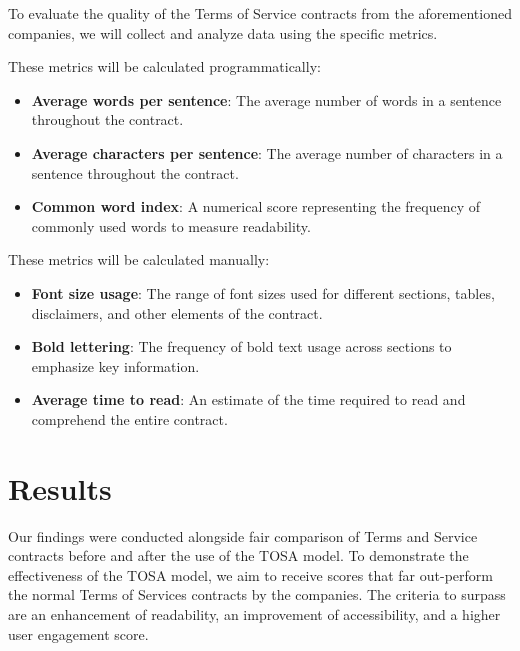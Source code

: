 \documentclass[sigconf, nonacm]{acmart}
\begin{document}
To evaluate the quality of the Terms of Service contracts from the aforementioned companies, we will collect and analyze data using the specific metrics.

These metrics will be calculated programmatically:
\begin{itemize}
\item \textbf{Average words per sentence}: The average number of words in a sentence throughout the contract.
\item \textbf{Average characters per sentence}: The average number of characters in a sentence throughout the contract.
\item \textbf{Common word index}: A numerical score representing the frequency of commonly used words to measure readability.
\end{itemize}

These metrics will be calculated manually:
\begin{itemize}
\item \textbf{Font size usage}: The range of font sizes used for different sections, tables, disclaimers, and other elements of the contract.
\item \textbf{Bold lettering}: The frequency of bold text usage across sections to emphasize key information.
\item \textbf{Average time to read}: An estimate of the time required to read and comprehend the entire contract.
\end{itemize}

\section{Results}
Our findings were conducted alongside fair comparison of Terms and Service contracts before and after the use of the TOSA model. To demonstrate the effectiveness of the TOSA model, we aim to receive scores that far out-perform the normal Terms of Services contracts by the companies. The criteria to surpass are an enhancement of readability, an improvement of accessibility, and a higher user engagement score.
\end{document}
